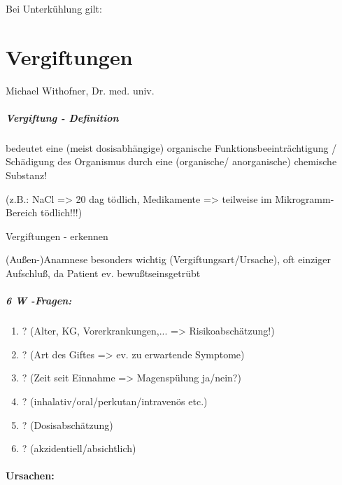 Bei Unterk\"uhlung gilt:




\section{Vergiftungen}

Michael Withofner, Dr. med. univ.

\subparagraph*{
Vergiftung - Definition}

{\mdseries
{} bedeutet eine (meist  dosisabhängige)
organische  Funktionsbeeinträchtigung / Schädigung  des Organismus
durch eine (organische/ anorganische) chemische Substanz!}

{\mdseries
(z.B.: NaCl ={\textgreater} 20 dag tödlich,  Medikamente
={\textgreater} teilweise im Mikrogramm- Bereich tödlich!!!)}

{\mdseries
Vergiftungen - erkennen}

(Au{\ss}en-)Anamnese besonders wichtig (Vergiftungsart/Ursache), oft
einziger Aufschlu{\ss}, da Patient ev. bewu{\ss}tseinsgetr\"ubt

\subparagraph*{6 W -Fragen:}

\begin{enumerate}
\item {}? (Alter, KG, Vorerkrankungen,...
={\textgreater} Risikoabschätzung!)
\item {}? (Art des Giftes ={\textgreater} ev.
zu erwartende Symptome)
\item {}? (Zeit seit Einnahme ={\textgreater}
Magensp\"ulung ja/nein?)
\item {}?
(inhalativ/oral/perkutan/intravenös etc.)
\item {}? (Dosisabschätzung)
\item {}? (akzidentiell/absichtlich)
\end{enumerate}



\paragraph{Ursachen:}

